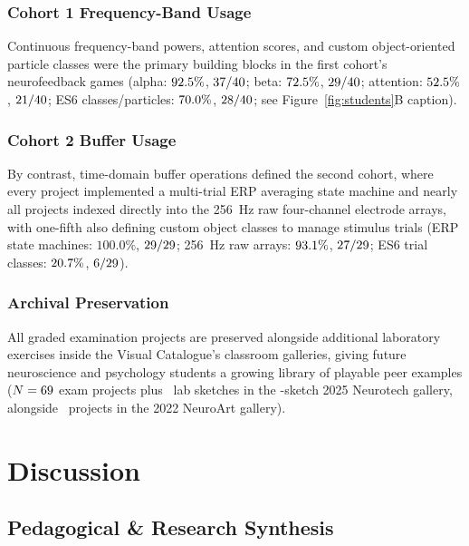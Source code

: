\documentclass[11pt]{article}
\begin{document}
\subsubsection{Cohort 1 Frequency-Band Usage}
Continuous frequency-band powers, attention scores, and custom object-oriented particle classes were the primary building blocks in the first cohort's neurofeedback games (alpha: $92.5\%$, $37/40$; beta: $72.5\%$, $29/40$; attention: $52.5\%$, $21/40$; ES6 classes/particles: $70.0\%$, $28/40$; see Figure~\ref{fig:students}B caption).

\subsubsection{Cohort 2 Buffer Usage}
By contrast, time-domain buffer operations defined the second cohort, where every project implemented a multi-trial ERP averaging state machine and nearly all projects indexed directly into the 256~Hz raw four-channel electrode arrays, with one-fifth also defining custom object classes to manage stimulus trials (ERP state machines: $100.0\%$, $29/29$; 256~Hz raw arrays: $93.1\%$, $27/29$; ES6 trial classes: $20.7\%$, $6/29$).

\subsubsection{Archival Preservation}
All graded examination projects are preserved alongside additional laboratory exercises inside the Visual Catalogue's classroom galleries, giving future neuroscience and psychology students a growing library of playable peer examples ($N = 69$ exam projects plus \NAdditionalSketches\ lab sketches in the \NNeurotechCatalogue-sketch 2025 Neurotech gallery, alongside \NNeuroArtGallery\ projects in the 2022 NeuroArt gallery).

\section{Discussion}

\subsection{Pedagogical \& Research Synthesis}
\end{document}
